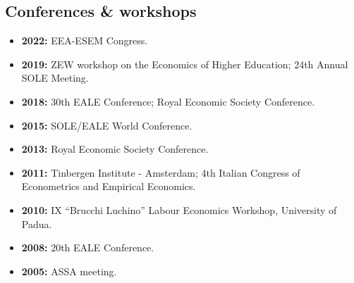 \documentclass[11pt]{article}
\begin{document}
\subsection*{\sc Conferences \& workshops}
\begin{itemize}[itemsep=.9pt, leftmargin=20pt]
    \item[]\textbf{2022:} EEA-ESEM Congress.
    \item[]\textbf{2019:} ZEW workshop on the Economics of Higher Education; 24th Annual SOLE Meeting.
    \item[]\textbf{2018:} 30th EALE Conference; Royal Economic Society Conference.
    \item[]\textbf{2015:} SOLE/EALE World Conference.
    \item[]\textbf{2013:} Royal Economic Society Conference.
    \item[]\textbf{2011:} Tinbergen Institute - Amsterdam; 4th Italian Congress of Econometrics and Empirical Economics.
    \item[]\textbf{2010:} IX “Brucchi Luchino” Labour Economics Workshop, University of Padua.
    \item[]\textbf{2008:} 20th EALE Conference.
    \item[]\textbf{2005:} ASSA meeting.
\end{itemize}
\end{document}
